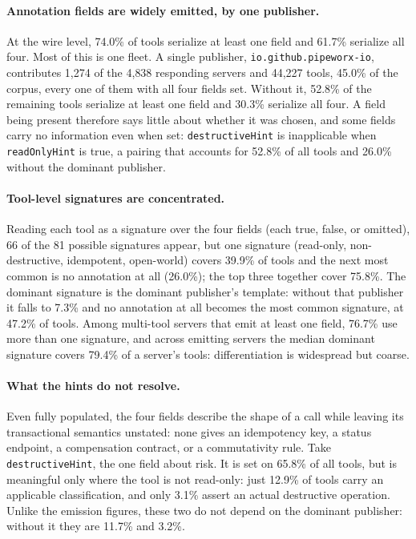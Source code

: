\documentclass{article}
\begin{document}
\paragraph{Annotation fields are widely emitted, by one publisher.}
At the wire level, 74.0\% of tools serialize at least one field and 61.7\%
serialize all four. Most of this is one fleet. A single publisher,
\texttt{io.github.pipeworx-io}, contributes 1{,}274 of the 4{,}838
responding servers and 44{,}227 tools, 45.0\% of the corpus, every one of
them with all four fields set. Without it, 52.8\% of the remaining tools
serialize at least one field and 30.3\% serialize all four. A field being
present therefore says little about whether it was chosen, and some fields
carry no information even when set: \texttt{destructiveHint} is
inapplicable when \texttt{readOnlyHint} is true, a pairing that accounts for
52.8\% of all tools and 26.0\% without the dominant publisher.

\paragraph{Tool-level signatures are concentrated.}
Reading each tool as a signature over the four fields (each true, false, or
omitted), 66 of the 81 possible signatures appear, but one signature
(read-only, non-destructive, idempotent, open-world) covers 39.9\% of tools
and the next most common is no annotation at all (26.0\%); the top three
together cover 75.8\%. The dominant signature is the dominant publisher's
template: without that publisher it falls to 7.3\% and no annotation at all
becomes the most common signature, at 47.2\% of tools. Among multi-tool
servers that emit at least one field, 76.7\% use more than one signature,
and across emitting servers the median dominant signature covers 79.4\% of
a server's tools: differentiation is widespread but coarse.

\paragraph{What the hints do not resolve.}
Even fully populated, the four fields describe the shape of a call while leaving its transactional semantics unstated: none gives an idempotency key, a status endpoint, a compensation contract, or a commutativity rule. Take \texttt{destructiveHint}, the one field about risk. It is set on
65.8\% of all tools, but is meaningful only where the tool is not
read-only: just 12.9\% of tools carry an applicable classification, and
only 3.1\% assert an actual destructive operation. Unlike the emission
figures, these two do not depend on the dominant publisher: without it
they are 11.7\% and 3.2\%.
\end{document}
